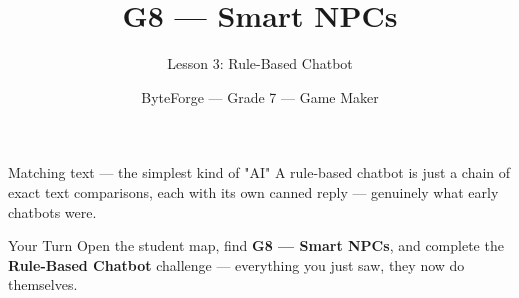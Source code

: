 \documentclass[aspectratio=169]{beamer}
\title{G8 — Smart NPCs}
\subtitle{Lesson 3: Rule-Based Chatbot}
\author{ByteForge --- Grade 7 --- Game Maker}
\date{}
\begin{document}
\begin{frame}
    \titlepage
\end{frame}

\begin{frame}{Matching text — the simplest kind of "AI"}
    \Large
    A rule-based chatbot is just a chain of exact text comparisons, each with its own canned reply — genuinely what early chatbots were.
\end{frame}

\begin{frame}{Your Turn}
    \Large
    Open the student map, find \textbf{G8 — Smart NPCs}, and complete
    the \textbf{Rule-Based Chatbot} challenge --- everything you just saw, they now do themselves.
\end{frame}
\end{document}
